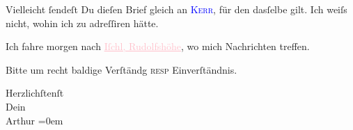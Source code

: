 \pstart
           Vielleicht ſendeſt Du dieſen Brief gleich an \textsc{\textcolor{blue}{Kerr}{}\ledrightnote{\textcolor{blue}{Alfred Kerr}}}, für den dasſelbe gilt. Ich weiſs nicht, wohin
               ich zu adreſſiren hätte.\pend
           
\pstart
           {\pb}Ich fahre morgen nach
                  \textcolor{pink}{\uline{Iſchl, Rudolfshöhe}}{}\ledrightnote{\textcolor{pink}{Hotel und Pension Rudolfshöhe (Leopold Petter)}}, wo mich \label{K_L03176-2v}\label{K_L03176-2h} Nachrichten treffen.\pend
           
\pstart
           Bitte um recht baldige Verſtändg \textsc{resp} Einverſtändnis.\pend
           
\pstart
           Herzlichſtenſt {\\[\baselineskip]}Dein {\\[\baselineskip]}\spacefill\mbox{Arthur}\pend
           \leftskip=0em{}\endnumbering{}  
      